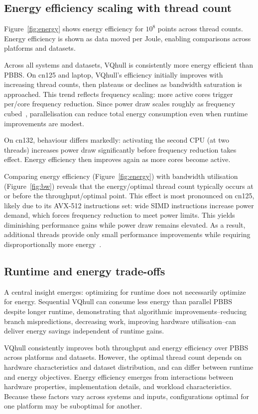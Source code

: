 \documentclass[11pt,a4paper]{article}
\begin{document}
\subsection{Energy efficiency scaling with thread count}
Figure~\ref{fig:energy} shows energy efficiency for $10^8$ points across thread counts.
Energy efficiency is shown as data moved per Joule, enabling comparisons across platforms and datasets.

Across all systems and datasets, VQhull is consistently more energy efficient than PBBS.
On cn125 and laptop, VQhull's efficiency initially improves with increasing thread counts, then plateaus or declines as bandwidth saturation is approached.
This trend reflects frequency scaling: more active cores trigger per\-/core frequency reduction.
Since power draw scales roughly as frequency cubed~\cite{kim2015stabilizing}, parallelisation can reduce total energy consumption even when runtime improvements are modest.

On cn132, behaviour differs markedly: activating the second CPU (at two threads) increases power draw significantly before frequency reduction takes effect.
Energy efficiency then improves again as more cores become active.

Comparing energy efficiency (Figure~\ref{fig:energy}) with bandwidth utilisation (Figure~\ref{fig:bw}) reveals that the energy\-/optimal thread count typically occurs at or before the throughput\-/optimal point.
This effect is most pronounced on cn125, likely due to its AVX-512 instructions set: wide SIMD instructions increase power demand, which forces frequency reduction to meet power limits.
This yields diminishing performance gains while power draw remains elevated.
As a result, additional threads provide only small performance improvements while requiring disproportionally more energy~\cite{gottschlag2021fair}.

\subsection{Runtime and energy trade-offs}
A central insight emerges: optimizing for runtime does not necessarily optimize for energy.
Sequential VQhull can consume less energy than parallel PBBS despite longer runtime, demonstrating that algorithmic improvements\---reducing branch mispredictions, decreasing work, improving hardware utilisation\---can deliver energy savings independent of runtime gains.

VQhull consistently improves both throughput and energy efficiency over PBBS across platforms and datasets.
However, the optimal thread count depends on hardware characteristics and dataset distribution, and can differ between runtime and energy objectives.
Energy efficiency emerges from interactions between hardware properties, implementation details, and workload characteristics.
Because these factors vary across systems and inputs, configurations optimal for one platform may be suboptimal for another.
\end{document}
